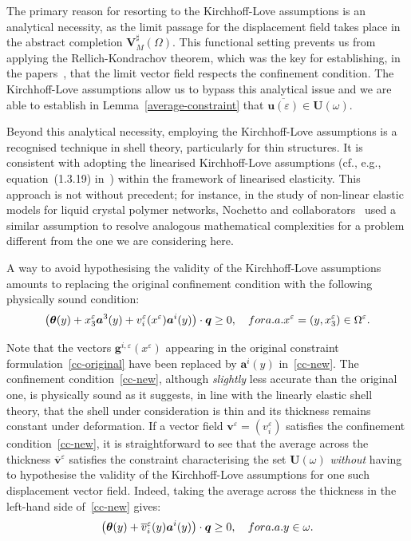 \documentclass{amsart}
\begin{document}
The primary reason for resorting to the Kirchhoff-Love assumptions is an analytical necessity, as the limit passage for the displacement field takes place in the abstract completion $\bm{V}_M^\sharp(\Omega)$. This functional setting prevents us from applying the Rellich-Kondrachov theorem, which was the key for establishing, in the papers~\cite{CiaPie2018b,CiaMarPie2018,PieJDE2022}, that the limit vector field respects the confinement condition.
The Kirchhoff-Love assumptions allow us to bypass this analytical issue and we are able to establish in Lemma~\ref{average-constraint} that $\overline{\bm{u}(\varepsilon)}\in\bm{U}(\omega)$.

Beyond this analytical necessity, employing the Kirchhoff-Love assumptions is a recognised technique in shell theory, particularly for thin structures. It is consistent with adopting the linearised Kirchhoff-Love assumptions (cf., e.g., equation~(1.3.19) in~\cite{BerBoi1982}) within the framework of linearised elasticity. This approach is not without precedent; for instance, in the study of non-linear elastic models for liquid crystal polymer networks, Nochetto and collaborators~\cite{BNY24} used a similar assumption to resolve analogous mathematical complexities for a problem different from the one we are considering here.

A way to avoid hypothesising the validity of the Kirchhoff-Love assumptions amounts to replacing the original confinement condition with the following physically sound condition:
\begin{equation}
	\label{cc-new}
	\left(\bm{\theta}(y)+x_3^\varepsilon\bm{a}^3(y)+v_i^\varepsilon(x^\varepsilon)\bm{a}^i(y)\right)\cdot\bm{q}\ge 0,\quad\textup{ for a.a. }x^\varepsilon=(y,x_3^\varepsilon)\in\Omega^\varepsilon.
\end{equation}

Note that the vectors $\bm{g}^{i,\varepsilon}(x^\varepsilon)$ appearing in the original constraint formulation~\eqref{cc-original} have been replaced by $\bm{a}^i(y)$ in~\eqref{cc-new}. The confinement condition~\eqref{cc-new}, although \emph{slightly} less accurate than the original one, is physically sound as it suggests, in line with the linearly elastic shell theory, that the shell under consideration is thin and its thickness remains constant under deformation. If a vector field $\bm{v}^\varepsilon=(v_i^\varepsilon)$ satisfies the confinement condition~\eqref{cc-new}, it is straightforward to see that the average across the thickness $\overline{\bm{v}}^\varepsilon$ satisfies the constraint characterising the set $\bm{U}(\omega)$ \emph{without} having to hypothesise the validity of the Kirchhoff-Love assumptions for one such displacement vector field. Indeed, taking the average across the thickness in the left-hand side of~\eqref{cc-new} gives:
\begin{equation*}
	\left(\bm{\theta}(y)+\overline{v}_i^\varepsilon(y)\bm{a}^i(y)\right)\cdot\bm{q}\ge 0,\quad\textup{ for a.a. }y\in\omega.
\end{equation*}
\end{document}
